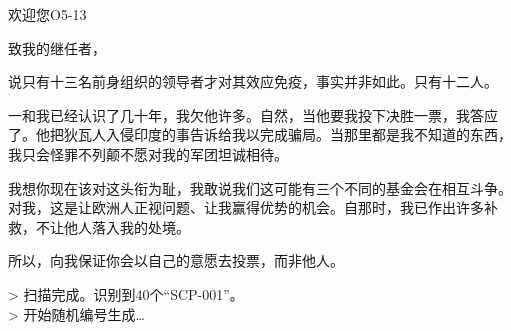 \begin{scpbox}

欢迎您O5-13

致我的继任者，

说只有十三名前身组织的领导者才对其效应免疫，事实并非如此。只有十二人。

一和我已经认识了几十年，我欠他许多。自然，当他要我投下决胜一票，我答应了。他把狄瓦人入侵印度的事告诉给我以完成骗局。当那里都是我不知道的东西，我只会怪罪不列颠不愿对我的军团坦诚相待。

我想你现在该对这头衔为耻，我敢说我们这可能有三个不同的基金会在相互斗争。对我，这是让欧洲人正视问题、让我赢得优势的机会。自那时，我已作出许多补救，不让他人落入我的处境。

所以，向我保证你会以自己的意愿去投票，而非他人。

\end{scpbox}


\hr

\begin{scpboxcmd}

> 扫描完成。识别到40个“SCP-001”。\\
> 开始随机编号生成…

\end{scpboxcmd}
